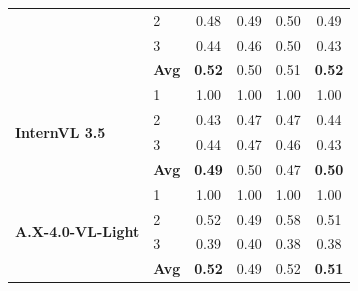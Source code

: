 \documentclass[11pt]{article}
\begin{document}
\begin{center}
\begin{tabular}{llcccc}
        & 2 & 0.48 & 0.49 & 0.50 & 0.49 \\
        & 3 & 0.44 & 0.46 & 0.50 & 0.43 \\
        & \textbf{Avg} & \textbf{0.52} & 0.50 & 0.51 & \textbf{0.52} \\
        \midrule
        \multirow{4}{*}{\textbf{InternVL 3.5}} & 1 & 1.00 & 1.00 & 1.00 & 1.00 \\
        & 2 & 0.43 & 0.47 & 0.47 & 0.44 \\
        & 3 & 0.44 & 0.47 & 0.46 & 0.43 \\
        & \textbf{Avg} & \textbf{0.49} & 0.50 & 0.47 & \textbf{0.50} \\
        \midrule
        \multirow{4}{*}{\textbf{A.X-4.0-VL-Light}} & 1 & 1.00 & 1.00 & 1.00 & 1.00 \\
        & 2 & 0.52 & 0.49 & 0.58 & 0.51 \\
        & 3 & 0.39 & 0.40 & 0.38 & 0.38 \\
        & \textbf{Avg} & \textbf{0.52} & 0.49 & 0.52 & \textbf{0.51} \\
        \bottomrule
    \end{tabular}
    \label{tab:results-korean-detailed}
\end{center}

\clearpage
\end{document}
